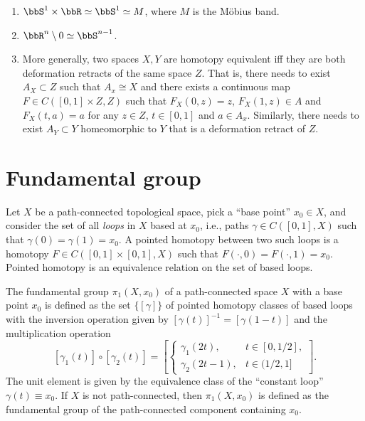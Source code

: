 \begin{example}
\begin{enumerate}
    \item $\bbS^1\times\bbR \simeq \bbS^1\simeq M$, where $M$ is the M\"obius band.
    \item $\bbR^n\setminus{0}\simeq \bbS^{n-1}$.
    \item More generally, two spaces $X,Y$ are homotopy equivalent iff they are both deformation retracts of the same space $Z$. That is, there needs to exist $A_X\subset Z$ such that $A_x\cong X$ and there exists a continuous map $F\in C([0,1]\times Z,Z)$ such that $F_X(0,z)=z$, $F_X(1,z)\in A$ and $F_X(t,a)=a$ for any $z\in Z$, $t\in [0,1]$ and $a\in A_x$. Similarly, there needs to exist $A_Y\subset Y$ homeomorphic to $Y$ that is a deformation retract of $Z$.
\end{enumerate}
\end{example}






\section{Fundamental group}

\begin{defn}
    Let $X$ be a path-connected topological space, pick a ``base point'' $x_0\in X$, and consider the set of all \emph{loops} in $X$ based at $x_0$, i.e., paths $\gamma\in C([0,1], X)$ such that $\gamma(0)=\gamma(1)=x_0$. A pointed homotopy between two such loops is a homotopy $F\in C([0,1]\times[0,1],X)$ such that $F(\cdot,0)=F(\cdot,1)=x_0$. Pointed homotopy is an equivalence relation on the set of based loops.
\end{defn}

\begin{defn}
    The fundamental group $\pi_1(X,x_0)$ of a path-connected space $X$ with a base point $x_0$ is defined as the set $\{ [\gamma]\}$ of pointed homotopy classes of based loops with the inversion operation given by $[\gamma(t)]^{-1}=[\gamma(1-t)]$ and the multiplication operation 
    \[
    [\gamma_1(t)]\circ [\gamma_2(t)]=\left[ \begin{cases} \gamma_1(2t), & t\in[0,1/2], \\ \gamma_2(2t-1), & t\in(1/2,1] \end{cases}\right].\label{pi1 group op}
    \]
    The unit element is given by the equivalence class of the ``constant loop'' $\gamma(t)\equiv x_0$. If $X$ is not path-connected, then $\pi_1(X,x_0)$ is defined as the fundamental group of the path-connected component containing $x_0$.
\end{defn}

